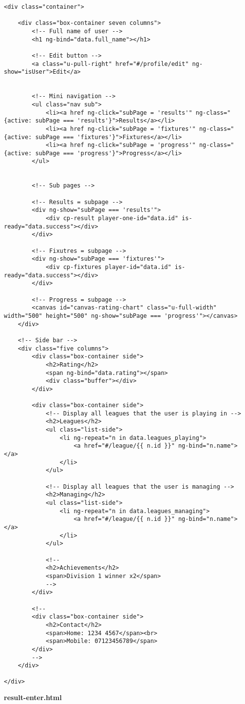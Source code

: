 {\scriptsize
\begin{lstlisting}
<div class="container">

	<div class="box-container seven columns">
		<!-- Full name of user -->
		<h1 ng-bind="data.full_name"></h1>

		<!-- Edit button -->
		<a class="u-pull-right" href="#/profile/edit" ng-show="isUser">Edit</a>


		<!-- Mini navigation -->
		<ul class="nav sub">
			<li><a href ng-click="subPage = 'results'" ng-class="{active: subPage === 'results'}">Results</a></li>
			<li><a href ng-click="subPage = 'fixtures'" ng-class="{active: subPage === 'fixtures'}">Fixtures</a></li>
			<li><a href ng-click="subPage = 'progress'" ng-class="{active: subPage === 'progress'}">Progress</a></li>
		</ul>


		<!-- Sub pages -->

		<!-- Results = subpage -->
		<div ng-show="subPage === 'results'">
			<div cp-result player-one-id="data.id" is-ready="data.success"></div>
		</div>

		<!-- Fixutres = subpage -->
		<div ng-show="subPage === 'fixtures'">
			<div cp-fixtures player-id="data.id" is-ready="data.success"></div>
		</div>

		<!-- Progress = subpage -->
		<canvas id="canvas-rating-chart" class="u-full-width" width="500" height="500" ng-show="subPage === 'progress'"></canvas>
	</div>

	<!-- Side bar -->
	<div class="five columns">
		<div class="box-container side">
			<h2>Rating</h2>
			<span ng-bind="data.rating"></span>
			<div class="buffer"></div>
		</div>

		<div class="box-container side">
			<!-- Display all leagues that the user is playing in -->
			<h2>Leagues</h2>
			<ul class="list-side">
				<li ng-repeat="n in data.leagues_playing">
					<a href="#/league/{{ n.id }}" ng-bind="n.name"></a>
				</li>
			</ul>

			<!-- Display all leagues that the user is managing -->
			<h2>Managing</h2>
			<ul class="list-side">
				<li ng-repeat="n in data.leagues_managing">
					<a href="#/league/{{ n.id }}" ng-bind="n.name"></a>
				</li>
			</ul>

			<!--
			<h2>Achievements</h2>
			<span>Division 1 winner x2</span>
			-->
		</div>

		<!--
		<div class="box-container side">
			<h2>Contact</h2>
			<span>Home: 1234 4567</span><br>
			<span>Mobile: 07123456789</span>
		</div>
		-->
	</div>

</div>\end{lstlisting}
}
\textbf{result-enter.html}\label{result-enter.html}

